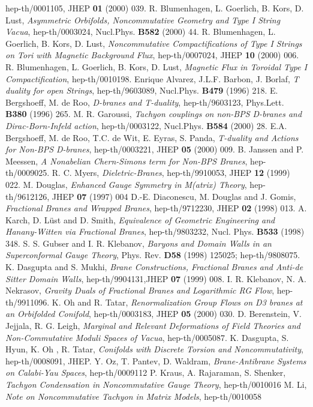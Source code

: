 \documentclass[a4paper,12pt]{article}
\begin{document}
\begin{thebibliography}{99}
hep-th/0001105, JHEP {\bf 01} (2000) 039.
R. Blumenhagen, L. Goerlich, B. Kors, D. Lust, 
{\it Asymmetric Orbifolds, Noncommutative Geometry and Type I String Vacua},
 hep-th/0003024, Nucl.Phys. {\bf B582} (2000) 44.
 R. Blumenhagen, L. Goerlich, B. Kors, D. Lust,
{\it Noncommutative Compactifications of Type I Strings on Tori with 
Magnetic Background Flux}, hep-th/0007024, JHEP {\bf 10} (2000) 006.
R. Blumenhagen, L. Goerlich, B. Kors, D. Lust,
{\it  Magnetic Flux in Toroidal Type I Compactification}, hep-th/0010198.
 Enrique Alvarez, J.L.F. Barbon, J. Borlaf,
{\it T duality for open Strings}, hep-th/9603089, Nucl.Phys. {\bf B479}
 (1996) 218.   
 E. Bergshoeff, M. de Roo, {\it D-branes and T-duality},
hep-th/9603123, Phys.Lett. {\bf B380} (1996) 265.
 M. R. Garoussi, {\it Tachyon couplings on non-BPS 
D-branes and Dirac-Born-Infeld action}, hep-th/0003122,
Nucl.Phys. {\bf B584} (2000) 28.
 E.A. Bergshoeff, M. de Roo, T.C. de Wit, E. Eyras, S. Panda,
{\it T-duality and Actions for Non-BPS D-branes}, 
hep-th/0003221, JHEP {\bf 05} (2000) 009.
 B. Janssen and P. Meessen, {\it A Nonabelian Chern-Simons term
for Non-BPS Branes}, hep-th/0009025.
 R. C. Myers, {\it Dieletric-Branes}, hep-th/9910053,
JHEP {\bf 12} (1999) 022.
 M. Douglas, {\it Enhanced Gauge
Symmetry in M(atrix) Theory}, hep-th/9612126, JHEP {\bf 07} (1997) 004 
 D.-E. Diaconescu, M. Douglas and J. Gomis, {\it
Fractional Branes and 
Wrapped Branes}, hep-th/9712230, JHEP {\bf 02}
(1998) 013.
 A. Karch, D. L\"ust and D. Smith, {\it
Equivalence of Geometric Engineering and Hanany-Witten via Fractional
Branes},
hep-th/9803232, Nucl. Phys. {\bf B533} (1998) 348.
 S. S. Gubser and I. R. Klebanov, {\it Baryons and Domain
Walls in an \coordHE{} Superconformal Gauge Theory},
Phys. Rev. {\bf D58} (1998) 125025; hep-th/9808075.
 K. Dasgupta and S. Mukhi, {\it Brane
Constructions, Fractional Branes and Anti-de Sitter Domain Walls},
hep-th/9904131,JHEP {\bf 07} (1999) 008.
 I. R. Klebanov, N. A. Nekrasov, {\it Gravity Duals of
Fractional Branes and Logarithmic RG Flow}, hep-th/9911096.
  K. Oh and R. Tatar, {\it Renormalization
Group Flows on D3 branes at an Orbifolded Conifold}, hep-th/0003183,
JHEP {\bf 05} (2000) 030.
 D. Berenstein, V. Jejjala, R. G. Leigh,
{\it  Marginal and Relevant Deformations of \coordHE{} 
Field Theories and Non-Commutative Moduli Spaces of Vacua}, hep-th/0005087.
 K. Dasgupta, S. Hyun, K. Oh , R. Tatar,
{\it Conifolds with Discrete Torsion and Noncommutativity}, 
hep-th/0008091, JHEP.
  Y. Oz, T. Pantev, D. Waldram, 
{\it Brane-Antibrane Systems on Calabi-Yau Spaces}, hep-th/0009112 
P. Kraus, A. Rajaraman, S. Shenker, {\it Tachyon 
Condensation in Noncommutative Gauge Theory},  hep-th/0010016 
 M. Li, {\it Note on Noncommutative Tachyon in Matrix Models},
hep-th/0010058 
\end{thebibliography}
\end{document}
